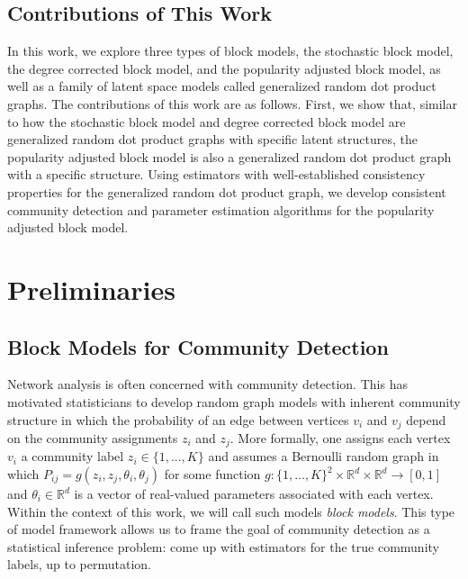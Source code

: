 \documentclass[
  11pt,
]{article}
\theoremstyle{definition}
\theoremstyle{definition}
\theoremstyle{definition}
\theoremstyle{definition}
\theoremstyle{remark}
\begin{document}
\hypertarget{contributions-of-this-work}{%
\subsection{Contributions of This Work}\label{contributions-of-this-work}}

In this work, we explore three types of block models, the stochastic block model, the degree corrected block model, and the popularity adjusted block model, as well as a family of latent space models called generalized random dot product graphs.
The contributions of this work are as follows.
First, we show that, similar to how the stochastic block model and degree corrected block model are generalized random dot product graphs with specific latent structures, the popularity adjusted block model is also a generalized random dot product graph with a specific structure.
Using estimators with well-established consistency properties for the generalized random dot product graph, we develop consistent community detection and parameter estimation algorithms for the popularity adjusted block model.

\newpage

\hypertarget{preliminaries}{%
\section{Preliminaries}\label{preliminaries}}

\hypertarget{sec:blockmodel}{%
\subsection{Block Models for Community Detection}\label{sec:blockmodel}}

Network analysis is often concerned with community detection.
This has motivated statisticians to develop random graph models with inherent community structure in which the probability of an edge between vertices \(v_i\) and \(v_j\) depend on the community assignments \(z_i\) and \(z_j\).
More formally, one assigns each vertex \(v_i\) a community label \(z_i \in \{1, ..., K\}\) and assumes a Bernoulli random graph in which \(P_{ij} = g(z_i, z_j, \theta_i, \theta_j)\) for some function \(g: \{1, ..., K\}^2 \times \mathbb{R}^d \times \mathbb{R}^d \to [0, 1]\) and \(\theta_i \in \mathbb{R}^d\) is a vector of real-valued parameters associated with each vertex.
Within the context of this work, we will call such models \emph{block models}.
This type of model framework allows us to frame the goal of community detection as a statistical inference problem:
come up with estimators for the true community labels, up to permutation.
\end{document}
